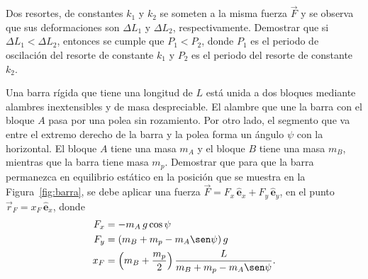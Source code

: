 \documentclass[addpoints]{exam}
\newcommand{\ver}[1]{\hat{\mathbf{#1}}}
\begin{document}
\begin{questions}
    \question Dos resortes, de constantes $k_1$ y $k_2$ se someten a la misma fuerza $\vec{F}$ y se observa que sus deformaciones son $\Delta L_1$ y $\Delta L_2$, respectivamente. Demostrar que si $\Delta L_1 < \Delta L_2$, entonces se cumple que $P_1 < P_2$, donde $P_1$ es el periodo de oscilación del resorte de constante $k_1$ y $P_2$ es el periodo del resorte de constante $k_2$.

    \question \label{ej:equilbrio_CR} Una barra rígida que tiene una longitud de $L$ está unida a dos bloques mediante alambres inextensibles y de masa despreciable. El alambre que une la barra con el bloque $A$ pasa por una polea sin rozamiento. Por otro lado, el segmento que va entre el extremo derecho de la barra y la polea forma un ángulo $\psi$ con la horizontal. El bloque $A$ tiene una masa $m_A$ y el bloque $B$ tiene una masa $m_B$, mientras que la barra tiene masa $m_p$. Demostrar que para que la barra permanezca en equilibrio estático en la posición que se muestra en la Figura~\ref{fig:barra}, se debe aplicar una fuerza $\vec{F} = F_x \, \ver{e}_x + F_y \, \ver{e}_y$, en el punto $\vec{r}_F = x_F \, \ver{e}_x$, donde
    \begin{align}
        F_x &= - m_A \, g \cos \psi \\
        F_y &= \left(m_B + m_p - m_A \sen \psi\right) g \\
        x_F &= \left(m_B + \frac{m_p}{2}\right) \frac{L}{m_B + m_p - m_A \sen \psi}.
    \end{align}


\end{questions}
\end{document}

